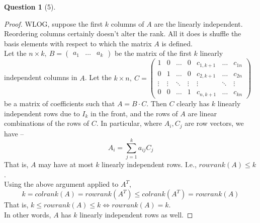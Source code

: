 \documentclass[11pt]{article}
\theoremstyle{quest}
\newtheorem*{question}{Question}
\begin{document}
\begin{question}[5]
\end{question}
\begin{proof}
WLOG, suppose the first $k$ columns of $A$ are the linearly independent. Reordering columns certainly doesn't alter the rank. All it does is shuffle the basis elements with respect to which the matrix $A$ is defined.
\\Let the $n \times k,\ B = \begin{pmatrix}
a_1 & \ldots & a_k
\end{pmatrix}$ be the matrix of the first $k$ linearly independent columns in $A$. Let the $k \times n,\ C = \begin{pmatrix}
1 & 0 & \ldots & 0 & c_{1,k+1} & \ldots & c_{1n} \\
0 & 1 & \ldots & 0 & c_{2,k+1} & \ldots & c_{2n} \\
\vdots & \vdots & \ddots & \vdots & \vdots & \ddots & \vdots \\
0 & 0 & \ldots & 1 & c_{n,k+1} & \ldots & c_{kn}
\end{pmatrix} $ be a matrix of coefficients such that $A = B \cdot C$. Then $C$ clearly has $k$ linearly independent rows due to $I_k$ in the front, and the rows of $A$ are linear combinations of the rows of $C$. In particular, where $A_i, C_j$ are row vectors, we have --
$$A_i = \sum_{j=1}^k a_{ij} C_j$$
That is, $A$ may have at most $k$ linearly independent rows. I.e., $\textit{rowrank}(A) \le k$.
\\Using the above argument applied to $A^T$,
$$k=\textit{colrank}(A) = \textit{rowrank}(A^T) \le \textit{colrank}(A^T) = \textit{rowrank}(A)$$
That is, $k \le \textit{rowrank}(A) \le k \iff \textit{rowrank}(A) = k$.
\\In other words, $A$ has $k$ linearly independent rows as well.
\end{proof}
\end{document}
